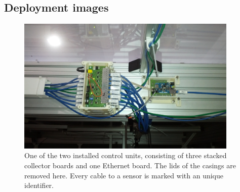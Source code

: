 \documentclass[a4paper]{scrreprt}
\begin{document}
\begin{appendices}
\chapter{Deployment images}
\begin{figure}[Hh!]
	\centering
	\includegraphics[width=0.94\textwidth]{img/control_unit.jpg}
	\caption{One of the two installed control units, consisting of three stacked collector boards and one Ethernet board. The lids of the casings are removed here. Every cable to a sensor is marked with an unique identifier.}
	\label{fig:control_unit} 
\end{figure}
\end{appendices}
\end{document}
